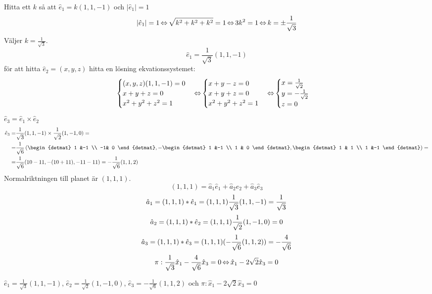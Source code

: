 \begin{task}{5.15}
	Hitta ett $k$ så att $\hat{e}_1=k(1,1,-1)$ och $|\hat{e}_1|=1$
	\[|\hat{e}_1
	|=1 \operatorname{\Leftrightarrow}
	\sqrt{k^2+k^2+k^2}=1 \operatorname{\Leftrightarrow}
	3k^2=1 \operatorname{\Leftrightarrow}
	k=\pm\frac{1}{\sqrt{3}}\]
	Väljer $k=\frac{1}{\sqrt{3}}$.
	\[\hat{e}_1=\frac{1}{\sqrt{3}}(1,1,-1)\]
	för att hitta $\hat{e}_2=(x,y,z)$ hitta en lösning ekvationssystemet:
	\begin{align*}
		\begin{cases}
			(x,y,z)\*(1,1,-1)=0 \\
			x+y+z=0 \\
			x^2+y^2+z^2=1
		\end{cases} \lra
		\begin{cases}
			x+y-z=0 \\
			x+y+z=0 \\
			x^2+y^2+z^2=1
		\end{cases} \lra
		\begin{cases}
			x=\frac{1}{\sqrt{2}} \\
			y=-\frac{1}{\sqrt{2}} \\
			z=0
		\end{cases}
	\end{align*}
	$\hat{e}_3=\hat{e}_1\times \hat{e}_2$
	\begin{align*}
		\hat{e}_3=&
		\frac{1}{\sqrt{3}}(1,1,-1)\times \frac{1}{\sqrt{2}}(1,-1,0)= \\ =
		&\frac{1}{\sqrt{6}}\left(\begin{detmat}
		1 &-1 \\
		-1& 0 
		\end{detmat},
		-\begin{detmat}
		1 &-1 \\
		1 & 0
		\end{detmat},
		\begin{detmat}
		1 & 1 \\
		1 &-1
		\end{detmat}\right)= \\ =
		&\frac{1}{\sqrt{6}}(1\*0-1\*1,-(1\*0+1\*1),-1\*1-1\*1)=
		-\frac{1}{\sqrt{6}}(1,1,2)
	\end{align*}
	Normalriktningen till planet är $(1,1,1)$.
	\[(1,1,1)=\hat{a}_1\hat{e}_1+\hat{a}_2\hat{e}_2+\hat{a}_3\hat{e}_3\]
	\[\hat{a}_1=(1,1,1)*\hat{e}_1=(1,1,1)\*\frac{1}{\sqrt{3}}(1,1,-1)=\frac{1}{\sqrt{3}}\]
	\[\hat{a}_2=(1,1,1)*\hat{e}_2=(1,1,1)\*\frac{1}{\sqrt{2}}(1,-1,0)=0\]
	\[\hat{a}_3=(1,1,1)*\hat{e}_3=(1,1,1)\*(-\frac{1}{\sqrt{6}}(1,1,2))=-\frac{4}{\sqrt{6}}\]
	\[\pi:\frac{1}{\sqrt{3}}\hat{x}_1-\frac{4}{\sqrt{6}}\hat{x}_3=0 \operatorname{\Leftrightarrow}
	\hat{x}_1-2\sqrt{2}\hat{x}_3=0\]
	
	\ans $\hat{e}_1=\frac{1}{\sqrt{3}}(1,1,-1)$, $\hat{e}_2=\frac{1}{\sqrt{2}}(1,-1,0)$, $\hat{e}_3=-\frac{1}{\sqrt{6}}(1,1,2)$ och $\pi:\hat{x}_1-2\sqrt{2}\hat{x}_3=0$
\end{task}


